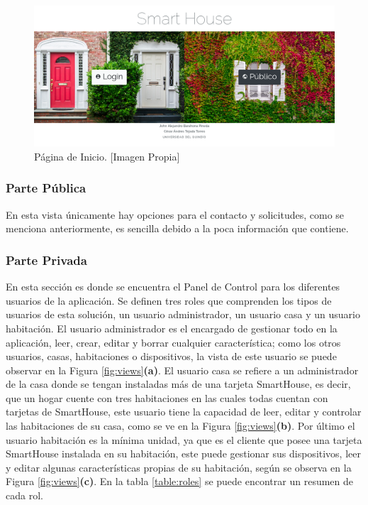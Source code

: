 \begin{figure}[!t]
	\centering
	\caption[Página de Inicio.]{Página de Inicio. [Imagen Propia]}
	\label{fig:index}
	\includegraphics[width=0.5\linewidth]{Imagenes/Index}
\end{figure}

\subsubsection{Parte Pública}

En esta vista únicamente hay opciones para el contacto y solicitudes, como se menciona anteriormente, es sencilla debido a la poca información que contiene.

\subsubsection{Parte Privada}

En esta sección es donde se encuentra el Panel de Control para los diferentes usuarios de la aplicación. Se definen tres roles que comprenden los tipos de usuarios de esta solución, un usuario administrador, un usuario casa y un usuario habitación. El usuario administrador es el encargado de gestionar todo en la aplicación, leer, crear, editar y borrar cualquier característica; como los otros usuarios, casas, habitaciones o dispositivos, la vista de este usuario se puede observar en la Figura \ref{fig:views}\textbf{(a)}. El usuario casa se refiere a un administrador de la casa donde se tengan instaladas más de una tarjeta SmartHouse, es decir, que un hogar cuente con tres habitaciones en las cuales todas cuentan con tarjetas de SmartHouse, este usuario tiene la capacidad de leer, editar y controlar las habitaciones de su casa, como se ve en la Figura \ref{fig:views}\textbf{(b)}. Por último el usuario habitación es la mínima unidad, ya que es el cliente que posee una tarjeta SmartHouse instalada en su habitación, este puede gestionar sus dispositivos, leer y editar algunas características propias de su habitación, según se observa en la Figura \ref{fig:views}\textbf{(c)}. En la tabla \ref{table:roles} se puede encontrar un resumen de cada rol.\\

